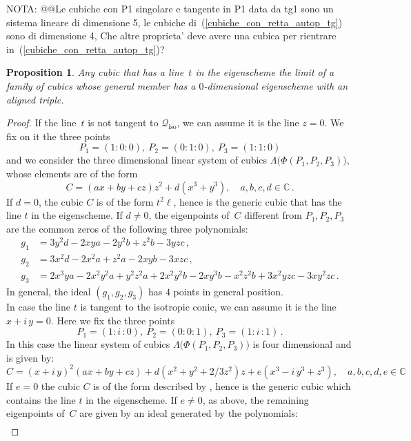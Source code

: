 \documentclass[a4paper, 11pt, reqno]{amsart}
\theoremstyle{plain}
\newtheorem{prop}[lemma]{Proposition}
\theoremstyle{definition}
\newcommand{\C}{\mathbb{C}}
\newcommand{\iii}{\textit{i}\,}
\newcommand{\iso}{\mathcal{Q}_{\mathrm{iso}}}
\begin{document}
NOTA: @@Le cubiche con P1 singolare e tangente in P1 data da tg1 sono
un sistema lineare di dimensione 5, le cubiche
di~(\ref{cubiche_con_retta_autop_tg}) sono di dimensione
4, Che altre proprieta' deve avere una cubica per rientrare
in~(\ref{cubiche_con_retta_autop_tg})?

%
\begin{prop}
\label{prop:limitCubics}
Any cubic that has a line~$t$ in the eigenscheme the limit of a family of cubics whose general member has a $0$-dimensional eigenscheme with an aligned triple.
\end{prop}
\begin{proof}
If the line~$t$ is not tangent to $\iso$, we can assume it is the line $z=0$. We fix on it the three points
%
\[
  P_1= (1: 0: 0), \ P_2 = (0: 1: 0), \ P_3 = (1: 1: 0)
\]
%
and we consider the three dimensional linear system of 
cubics $\Lambda \bigl( \Phi(P_1, P_2, P_3) \bigr)$, whose elements are of the form
%
\[
  C = (ax + by + cz)z^2 + d(x^3+y^3), \quad a, b, c, d \in \C \,.
\]
%
If $d=0$, the cubic $C$ is of the form $t^2 \ell$, hence is the 
generic cubic that has the line $t$ in the eigenscheme.
If $d \neq 0$, the eigenpoints of~$C$ different from $P_1, P_2, P_3$ are
the common zeros of the following three polynomials:
%
\begin{align*}
  g_1 & = 3y^2d - 2xya - 2y^2b + z^2b - 3yzc \,,\\
  g_2 & = 3x^2d - 2x^2a + z^2a - 2xyb - 3xzc \,,\\
  g_3 & = 2x^3ya - 2x^2y^2a + y^2z^2a + 2x^2y^2b -
          2xy^3b - x^2z^2b + 3x^2yzc - 3xy^2zc \,.
\end{align*}
%
In general, the ideal $(g_1, g_2, g_3)$ has $4$ points in 
general position. \\
In case the line $t$ is tangent to the isotropic conic, we can 
assume it is the line $x+\iii y =0$. Here we fix the three
points
\[
P_1 = (1: \iii: 0), \ P_2 = (0: 0: 1), \ P_3 = (1: \iii: 1) \,.
\]
In this case the linear system of cubics 
$\Lambda \bigl(\Phi(P_1, P_2, P_3)\bigr)$ is four dimensional and 
is given by:
\[
C = (x+\iii y)^2(ax + by+cz)+
 d(x^2 + y^2 + 2/3z^2)z+e (x^3 -\iii y^3 + z^3), 
 \quad a, b, c, d, e \in \C
\]
If $e=0$ the cubic $C$ is of the form described by , hence is the generic cubic which contains the line $t$ in the eigenscheme. If $e \not= 0$, as above, 
the remaining eigenpoints of~$C$ are given by an ideal generated 
by the polynomials:
%
\begin{align*}

\end{align*}
\end{proof}
\end{document}
